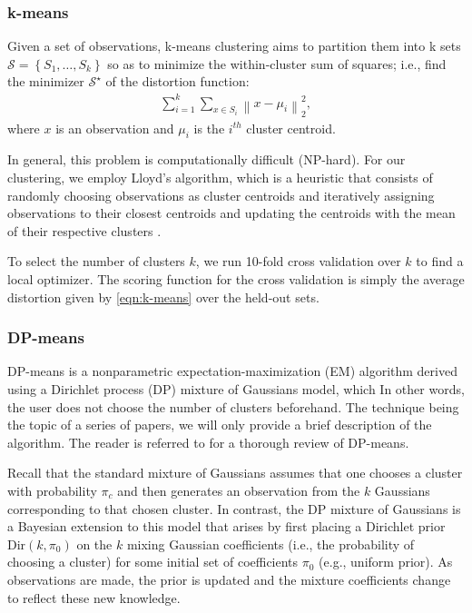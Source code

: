 \documentclass[letterpaper,10 pt,conference]{ieeeconf}
\begin{document}
\subsubsection{k-means}

Given a set of observations, k-means clustering aims to partition them into k sets $\mathcal{S} = \left\{ S_{1},\ldots,S_{k} \right\}$ so as to minimize the within-cluster sum of squares; i.e., find the minimizer $\mathcal{S}^{\star}$ of the distortion function:
\begin{align}
  \sum_{i=1}^{k}\sum_{x \in S_{i}}\left\| x - \mu_{i} \right\|_{2}^{2},
  \label{eqn:k-means}
\end{align}
where $x$ is an observation and $\mu_{i}$ is the $i^{th}$ cluster centroid.

In general, this problem is computationally difficult (NP-hard). For our clustering, we employ Lloyd's algorithm, which is a heuristic that consists of randomly choosing observations as cluster centroids and iteratively assigning observations to their closest centroids and updating the centroids with the mean of their respective clusters \cite{Ng:14}. 

To select the number of clusters $k$, we run 10-fold cross validation over $k$ to find a local optimizer. The scoring function for the cross validation is simply the average distortion given by \eqref{eqn:k-means} over the held-out sets. 

\subsubsection{DP-means}

DP-means is a nonparametric expectation-maximization (EM) algorithm derived using a Dirichlet process (DP) mixture of Gaussians model, which  In other words, the user does not choose the number of clusters beforehand. The technique being the topic of a series of papers, we will only provide a brief description of the algorithm. The reader is referred to \cite{TKJ:13,KJ:12} for a thorough review of DP-means. 

Recall that the standard mixture of Gaussians assumes that one chooses a cluster with probability $\pi_{c}$ and then generates an observation from the $k$ Gaussians corresponding to that chosen cluster. In contrast, the DP mixture of Gaussians is a Bayesian extension to this model that arises by first placing a Dirichlet prior $\text{Dir}(k,\pi_{0})$ on the $k$ mixing Gaussian coefficients (i.e., the probability of choosing a cluster) for some initial set of coefficients $\pi_{0}$ (e.g., uniform prior). As observations are made, the prior is updated and the mixture coefficients change to reflect these new knowledge.
\end{document}
